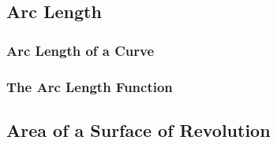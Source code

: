 \subsection{Arc Length}

\subsubsection*{Arc Length of a Curve}

\subsubsection*{The Arc Length Function}

\subsection{Area of a Surface of Revolution}